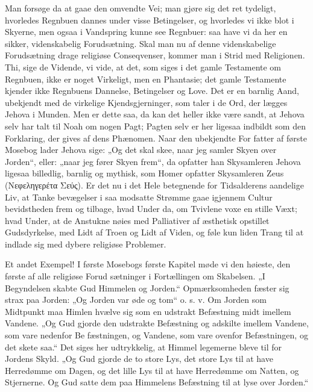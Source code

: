 \documentclass[12pt]{book}
\newcommand{\opage}[1]{\marginnote{\footnotesize\textit{[#1]}}}
\begin{document}
Man forsøge da at gaae den omvendte Vei; man
gjøre sig det ret tydeligt, hvorledes Regnbuen dannes
under visse Betingelser, og hvorledes vi ikke blot i
Skyerne, men ogsaa i Vandspring kunne see Regnbuer:
saa have vi da her en sikker, videnskabelig Forudsætning.
Skal man nu af denne videnskabelige Forudsætning
drage religiøse Conseqvenser, kommer man i Strid med
Religionen. Thi, sige de Vidende, vi vide, at det, som
siges i det gamle Testamente om Regnbuen, ikke er
noget Virkeligt, men en Phantasie; det gamle Testamente
kjender ikke Regnbuens Dannelse, Betingelser og Love.
Det er en barnlig Aand, ubekjendt med de virkelige
Kjendsgjerninger, som taler i de Ord, der lægges Jehova
i Munden. Men er dette saa, da kan det heller ikke
være sandt, at Jehova selv har talt til Noah om nogen Pagt;
Pagten selv er her ligesaa indbildt som den Forklaring,
der gives af dens Phænomen. Naar den ubekjendte For\-%
fatter af første Mosebog lader Jehova sige: „Og det skal
skee, naar jeg samler Skyen over Jorden“, eller: „naar
jeg fører Skyen frem“, da opfatter han Skysamleren Jehova
ligesaa billedlig, barnlig og mythisk, som Homer opfatter
Skysamleren Zeus (Νεφεληγερέτα Σεύς). %
Er det nu i det
Hele betegnende for Tidsalderens aandelige Liv, at Tanke\-%
bevægelser i saa modsatte Strømme gaae igjennem Cultur\-%
bevidstheden frem og tilbage, hvad Under da, om Tvivlene
\opage{64}\setcounter{footnote}{0}%
voxe en stille Væxt; hvad Under, at de Anstukne nøies
med Palliativer af æsthetisk opstillet Gudsdyrkelse, med
Lidt af Troen og Lidt af Viden, og føle kun liden
Trang til at indlade sig med dybere religiøse Problemer.

Et andet Exempel! I første Mosebogs første Kapitel
møde vi den høieste, den første af alle religiøse Forud\-%
sætninger i Fortællingen om Skabelsen. „I Begyndelsen
skabte Gud Himmelen og Jorden.“ Opmærksomheden
fæster sig strax paa Jorden: „Og Jorden var øde og
tom“ o. s. v. Om Jorden som Midtpunkt maa Himlen
hvælve sig som en udstrakt Befæstning midt imellem
Vandene. „Og Gud gjorde den udstrakte Befæstning
og adskilte imellem Vandene, som vare nedenfor Be\-%
fæstningen, og Vandene, som vare ovenfor Befæstningen,
og det skete saa.“ Det siges her udtrykkelig, at Himmel\-%
legemerne bleve til for Jordens Skyld. „Og Gud gjorde
de to store Lys, det store Lys til at have Herredømme
om Dagen, og det lille Lys til at have Herredømme om
Natten, og Stjernerne. Og Gud satte dem paa Himmelens
Befæstning til at lyse over Jorden.“
\end{document}
